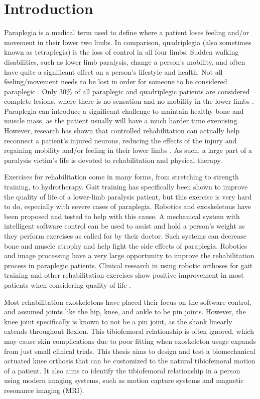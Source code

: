 \chapter{Introduction}
Paraplegia is a medical term used to define where a patient loses feeling and/or movement in their lower two limbs. In comparison, quadriplegia (also sometimes known as tetraplegia) is the loss of control in all four limbs. Sudden walking disabilities, such as lower limb paralysis, change a person's mobility, and often have quite a significant effect on a person's lifestyle and health. Not all feeling/movement needs to be lost in order for someone to be considered paraplegic \cite{IncompleteTraumaticQuadrilegia}. Only 30\% of all paraplegic and quadriplegic patients are considered complete lesions, where there is no sensation and no mobility in the lower limbs \cite{RehabParaplegia}. Paraplegia can introduce a significant challenge to maintain healthy bone and muscle mass, as the patient usually will have a much harder time exercising. However, research has shown that controlled rehabilitation can actually help reconnect a patient's injured neurons, reducing the effects of the injury and regaining mobility and/or feeling in their lower limbs \cite{GaitTrainingClinical}. As such, a large part of a paralysis victim's life is devoted to rehabilitation and physical therapy.

Exercises for rehabilitation come in many forms, from stretching to strength training, to hydrotherapy. Gait training has specifically been shown to improve the quality of life of a lower-limb paralysis patient, but this exercise is very hard to do, especially with severe cases of paraplegia. Robotics and exoskeletons have been proposed and tested to help with this cause. A mechanical system with intelligent software control can be used to assist and hold a person's weight as they perform exercises as called for by their doctor. Such systems can decrease bone and muscle atrophy and help fight the side effects of paraplegia. Robotics and image processing have a very large opportunity to improve the rehabilitation process in paraplegic patients. Clinical research in using robotic orthoses for gait training and other rehabilitation exercises show positive improvement in most patients when considering quality of life \cite{GaitTrainingBenefitsRoboticsWalkbot} \cite{RoboticGaitTraining}. 

Most rehabilitation exoskeletons have placed their focus on the software control, and assumed joints like the hip, knee, and ankle to be pin joints. However, the knee joint specifically is known to not be a pin joint, as the shank linearly extends throughout flexion. This tibiofemoral relationship is often ignored, which may cause skin complications due to poor fitting when exoskeleton usage expands from just small clinical trials. This thesis aims to design and test a biomechanical actuated knee orthosis that can be customized to the natural tibiofemoral motion of a patient. It also aims to identify the tibiofemoral relationship in a person using modern imaging systems, such as motion capture systems and magnetic resonance imaging (MRI).

